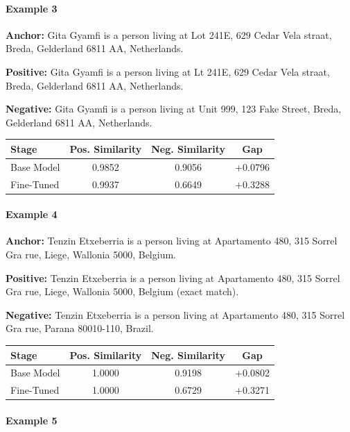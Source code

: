 \documentclass{article}
\begin{document}
\paragraph{Example 3}

\textbf{Anchor:} Gita Gyamfi is a person living at Lot 241E, 629 Cedar Vela straat, Breda, Gelderland 6811 AA, Netherlands.

\textbf{Positive:} Gita Gyamfi is a person living at Lt 241E, 629 Cedar Vela straat, Breda, Gelderland 6811 AA, Netherlands.

\textbf{Negative:} Gita Gyamfi is a person living at Unit 999, 123 Fake Street, Breda, Gelderland 6811 AA, Netherlands.

\begin{center}
\small
\begin{tabular}{lccc}
\toprule
Stage & Pos. Similarity & Neg. Similarity & Gap \\
\midrule
Base Model & 0.9852 & 0.9056 & +0.0796 \\
Fine-Tuned & 0.9937 & 0.6649 & +0.3288 \\
\bottomrule
\end{tabular}
\end{center}

\paragraph{Example 4}

\textbf{Anchor:} Tenzin Etxeberria is a person living at Apartamento 480, 315 Sorrel Gra rue, Liege, Wallonia 5000, Belgium.

\textbf{Positive:} Tenzin Etxeberria is a person living at Apartamento 480, 315 Sorrel Gra rue, Liege, Wallonia 5000, Belgium (exact match).

\textbf{Negative:} Tenzin Etxeberria is a person living at Apartamento 480, 315 Sorrel Gra rue, Parana 80010-110, Brazil.

\begin{center}
\small
\begin{tabular}{lccc}
\toprule
Stage & Pos. Similarity & Neg. Similarity & Gap \\
\midrule
Base Model & 1.0000 & 0.9198 & +0.0802 \\
Fine-Tuned & 1.0000 & 0.6729 & +0.3271 \\
\bottomrule
\end{tabular}
\end{center}

\paragraph{Example 5}
\end{document}
